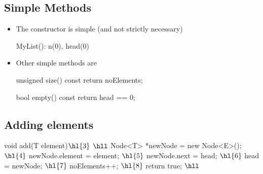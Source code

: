 
\begin{slide}
\section{Simple Methods}

\vspace{-1cm}
\begin{PauseHighLight}
  \begin{itemize}
  \item The constructor is simple (and not strictly necessary)
    \begin{cpp}
  MyList(): n(0), head(0) {}
    \end{cpp}\pause \vspace{-1cm}
  \item Other simple methods are
    \begin{cpp}
  unsigned size() const {return noElements;}

  bool empty() const {
    return head == 0;
  }
    \end{cpp}\pause
  \end{itemize}\vspace{-1cm}
\end{PauseHighLight}
\end{slide}


\begin{slide}
\section{Adding elements}

\pausebuild
\begin{cpp}
    void add(T element)$\hl{3}$ 
    {$\hll$
        Node<T> *newNode = new Node<E>(); $\hl{4}$ 
        newNode.element = element; $\hl{5}$
        newNode.next = head; $\hl{6}$
        head = newNode; $\hl{7}$
        noElements++; $\hl{8}$
        return true;
    }$\hll$
\end{cpp}
\begin{center}
  \pause
\end{center}
\end{slide}


